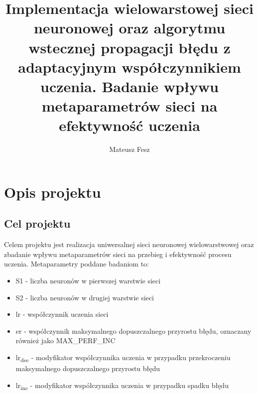 \documentclass[12pt,twoside]{article}
\author{Mateusz Fesz}
\title{Implementacja wielowarstowej sieci neuronowej oraz algorytmu wstecznej propagacji błędu z adaptacyjnym współczynnikiem uczenia. Badanie wpływu metaparametrów sieci na efektywność uczenia}
\begin{document}
\maketitle

\blankpage

\tableofcontents

\clearpage
\blankpage

\section{Opis projektu}
\subsection{Cel projektu}
Celem projektu jest realizacja uniwersalnej sieci neuronowej wielowarstwowej oraz zbadanie wpływu metaparametrów sieci na przebieg i efektywność procesu uczenia.
Metaparametry poddane badaniom to:
\begin{itemize}
	\item S1 - liczba neuronów w pierwszej warstwie sieci
	\item S2 - liczba neuronów w drugiej warstwie sieci
	\item lr - współczynnik uczenia sieci
	\item er - współczynnik maksymalnego dopuszczalnego przyrostu błędu, oznaczany również jako MAX\_PERF\_INC
	\item lr\textsubscript{dec} - modyfikator współczynnika uczenia w przypadku przekroczeniu maksymalnego dopuszczalnego przyrostu błędu
	\item lr\textsubscript{inc} - modyfikator współczynnika uczenia w przypadku spadku błędu
\end{itemize}
\end{document}

